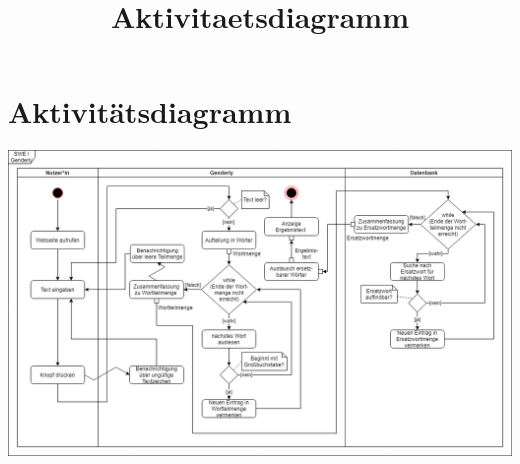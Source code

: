 \documentclass[paper=a4, parskip=half]{scrreprt}
\begin{document}
\title{Aktivitaetsdiagramm} %





\chapter{Aktivitätsdiagramm}
\begin{adjustbox}{center,caption=
		{UML-Aktivitätsdiagramm für Genderly}
		,label={UML-Aktivitätsdiagramm für Genderly} ,nofloat=figure,vspace=\bigskipamount}
	\includegraphics[width=\textwidth]{Bilder/Diagramme/Aktivitaetsdiagramm.png}
\end{adjustbox}
\vspace{0.25cm}
\end{document}
